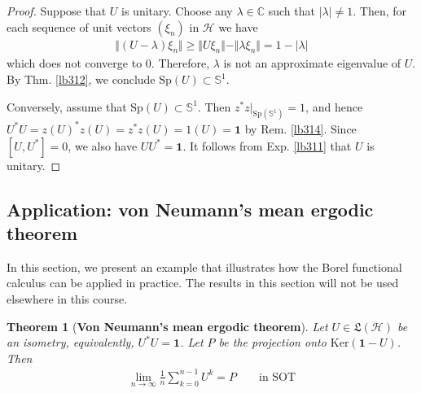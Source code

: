 \documentclass[12pt,b5paper,notitlepage]{article}
\theoremstyle{definition}
\newtheorem{df}{Definition}[subsection]
\theoremstyle{plain}
\newtheorem{thm}[df]{Theorem}
\newcommand{\fk}{\mathfrak}
\newcommand{\idt}{\mathbf{1}}
\newcommand{\Cbb}{\mathbb C}
\newcommand{\Ker}{\mathrm{Ker}}
\newcommand{\Sp}{\mathrm{Sp}}
\newcommand{\Sbb}{{\mathbb S}}
\newcommand{\Fbb}{\mathbb F}
\newcommand{\Lin}{\mathrm{Lin}}
\newcommand{\MH}{\mathcal H}
\numberwithin{equation}{section}
\begin{document}
\begin{proof}
Suppose that $U$ is unitary. Choose any $\lambda\in\Cbb$ such that $|\lambda|\neq 1$. Then, for each sequence of unit vectors $(\xi_n)$ in $\MH$ we have
\begin{align*}
\Vert (U-\lambda)\xi_n\Vert\geq \Vert U\xi_n\Vert-\Vert\lambda\xi_n\Vert=1-|\lambda|
\end{align*}
which does not converge to $0$. Therefore, $\lambda$ is not an approximate eigenvalue of $U$. By Thm. \ref{lb312}, we conclude $\Sp(U)\subset\Sbb^1$.

Conversely, assume that $\Sp(U)\subset\Sbb^1$. Then $z^*z|_{\Sp(\Sbb^1)}=1$, and hence $U^*U=z(U)^*z(U)=z^*z(U)=1(U)=\idt$ by Rem. \ref{lb314}. Since $[U,U^*]=0$, we also have $UU^*=\idt$. It follows from Exp. \ref{lb311} that $U$ is unitary.
\end{proof}











\begin{comment}
\begin{df}
Let $V$ is an $\Fbb$-vector space $T\in\Lin(V)$. Let $\lambda\in\Fbb$. We say that $\xi\in V$ is an \textbf{$\pmb\lambda$-eigenvector} of $T$ if $T\xi=\lambda\xi$. If there exists a non-zero $\lambda$-eigenvector of $T$, we say that $\lambda$ is an \textbf{eigenvalue} of $T$. \index{00@Eigenvalues and eigenvectors}
\end{df}
\end{comment}









\subsection{Application: von Neumann's mean ergodic theorem}

In this section, we present an example that illustrates how the Borel functional calculus can be applied in practice. The results in this section will not be used elsewhere in this course.



\begin{thm}[\textbf{Von Neumann's mean ergodic theorem}]\label{lb321}
Let $U\in\fk L(\MH)$ be an isometry, equivalently, $U^*U=\idt$. Let $P$ be the projection onto $\Ker(\idt-U)$. Then
\begin{align}\label{eq169}
\lim_{n\rightarrow\infty}\frac 1{n}\sum_{k=0}^{n-1}U^k=P\qquad\text{in SOT}
\end{align}
\end{thm}
\end{document}
